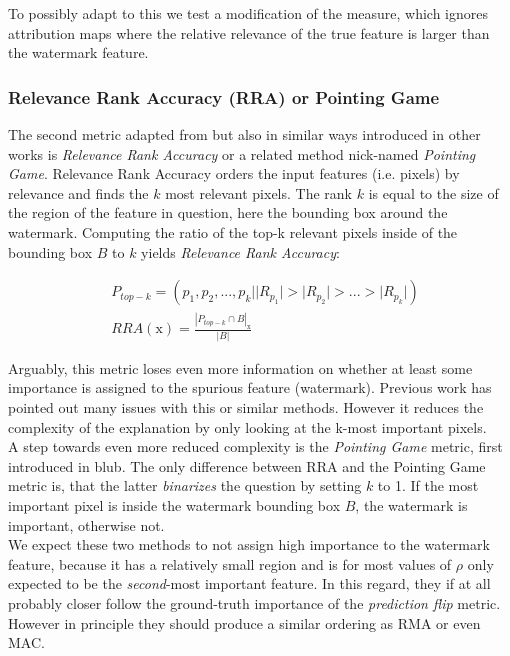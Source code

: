 To possibly adapt to this we test a modification of the measure, which ignores attribution maps where the relative relevance of the true feature is larger than the watermark feature. 


\subsubsection{Relevance Rank Accuracy (RRA) or Pointing Game}
The second metric adapted from \cite{Arras2022} but also in similar ways introduced in other works is \textit{Relevance Rank Accuracy} or a related method nick-named \textit{Pointing Game}.  
Relevance Rank Accuracy orders the input features (i.e. pixels) by relevance and finds the $k$ most relevant pixels. The rank $k$ is equal to the size of the region of the feature in question, here the bounding box around the watermark. Computing the ratio of the top-k relevant pixels inside of the bounding box $B$ to $k$ yields \textit{Relevance Rank Accuracy}:

\begin{align*}
& P_{top-k} = (p_1, p_2,...,p_k | |R_{p_1}| > |R_{p_2}| > ... > |R_{p_k}| ) \\
& RRA(\mathrm{x}) = \frac{|P_{top-k} \cap B|_\mathrm{x}}{|B|} 
\end{align*}

Arguably, this metric loses even more information on whether at least some importance is assigned to the spurious feature (watermark). Previous work has pointed out many issues with this or similar methods. However it reduces the complexity of the explanation by only looking at the k-most important pixels. \\

A step towards even more reduced complexity is the \textit{Pointing Game} metric, first introduced in blub. The only difference between RRA and the Pointing Game metric is, that the latter \textit{binarizes} the question by setting $k$ to 1. If the most important pixel is inside the watermark bounding box $B$, the watermark is important, otherwise not. \\

We expect these two methods to not assign high importance to the watermark feature, because it has a relatively small region and is for most values of $\rho$ only expected to be the \textit{second}-most important feature. In this regard, they if at all probably closer follow the ground-truth importance of the \textit{prediction flip} metric. However in principle they should produce a similar ordering as RMA or even MAC. 


